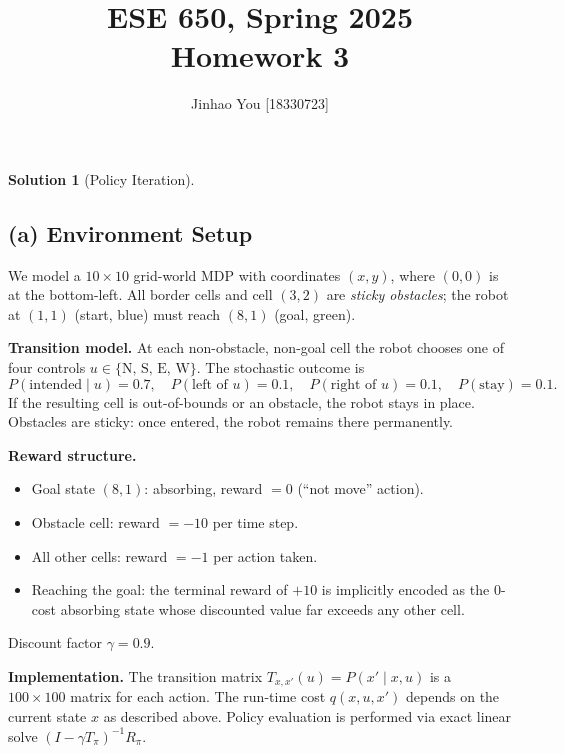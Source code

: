 \documentclass[11pt, reqno, letterpaper, twoside]{amsart}
\title{ESE 650, Spring 2025\\[0.1in]
Homework 3}
\author{
Jinhao You [18330723]
}
\theoremstyle{plain}
\theoremstyle{definition}
\newtheorem{solution}[theorem]{Solution}
\begin{document}
\maketitle

\begin{solution}[Policy Iteration]

\subsection*{(a) Environment Setup}

We model a $10 \times 10$ grid-world MDP with coordinates $(x,y)$, where $(0,0)$ is at the bottom-left.  All border cells and cell $(3,2)$ are \emph{sticky obstacles}; the robot at $(1,1)$ (start, blue) must reach $(8,1)$ (goal, green).

\medskip
\noindent\textbf{Transition model.}
At each non-obstacle, non-goal cell the robot chooses one of four controls $u \in \{\text{N, S, E, W}\}$.  The stochastic outcome is
\[
  P(\text{intended} \mid u) = 0.7, \quad
  P(\text{left of } u) = 0.1, \quad
  P(\text{right of } u) = 0.1, \quad
  P(\text{stay}) = 0.1.
\]
If the resulting cell is out-of-bounds or an obstacle, the robot stays in place.
Obstacles are sticky: once entered, the robot remains there permanently.

\medskip
\noindent\textbf{Reward structure.}
\begin{itemize}
  \item Goal state $(8,1)$: absorbing, reward $= 0$ (``not move'' action).
  \item Obstacle cell: reward $= -10$ per time step.
  \item All other cells: reward $= -1$ per action taken.
  \item Reaching the goal: the terminal reward of $+10$ is implicitly encoded as the 0-cost absorbing state whose discounted value far exceeds any other cell.
\end{itemize}
Discount factor $\gamma = 0.9$.

\medskip
\noindent\textbf{Implementation.}
The transition matrix $T_{x,x'}(u) = P(x'\mid x, u)$ is a $100\times 100$ matrix for each action.  The run-time cost $q(x,u,x')$ depends on the current state $x$ as described above.  Policy evaluation is performed via exact linear solve $(I - \gamma T_\pi)^{-1} R_\pi$.


\end{solution}
\end{document}
